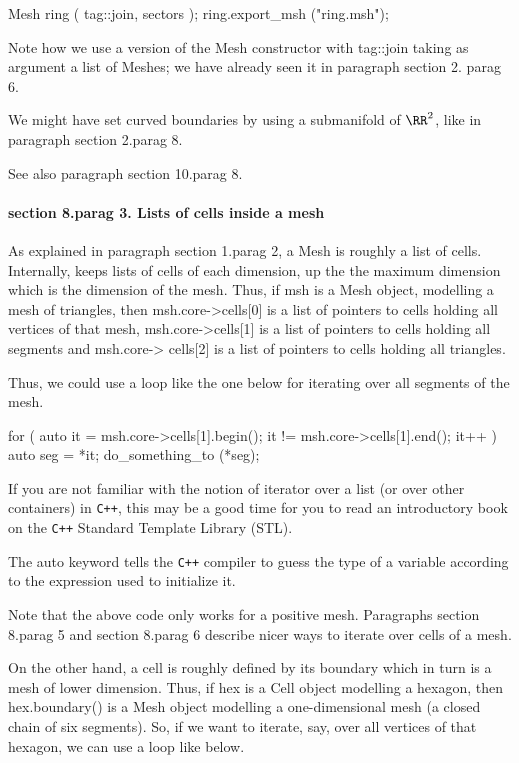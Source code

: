    Mesh ring ( tag::join, sectors );
   ring.export_msh ("ring.msh");
\endverbatim

Note how we use a version of the {\codett Mesh} constructor with {\codett tag::join} taking as
argument a list of {\codett Mesh}es; we have already seen it in paragraph \numb section 2.\numb
parag 6.

We might have set curved boundaries by using a submanifold of $ \RR^2 $, like in paragraph
\numb section 2.\numb parag 8.

See also paragraph \numb section 10.\numb parag 8.


\paragraph{\numb section 8.\numb parag 3. Lists of cells inside a mesh}

As explained in paragraph \numb section 1.\numb parag 2, a {\codett Mesh} is
roughly a list of cells.
Internally, {\maniFEM} keeps lists of cells of each dimension, up the the maximum
dimension which is the dimension of the mesh.
Thus, if {\codett msh} is a {\codett Mesh} object, modelling a
mesh of triangles, then {\codett msh.core->cells[0]} is a list of pointers to cells holding
all vertices of that mesh, {\codett msh.core->cells[1]} is a list of pointers to cells
holding all segments and {\codett msh.core-> cells[2]} is a list of pointers to cells
holding all triangles.

Thus, we could use a loop like the one below for iterating over all segments of the mesh.

\verbatim
   for ( auto it = msh.core->cells[1].begin();
              it != msh.core->cells[1].end();  it++ )
   { auto seg = *it;  do_something_to (*seg);  }
\endverbatim

If you are not familiar with the notion of iterator over a list (or over other containers)
in {\tt C++}, this may be a good time for you to read an introductory book on the
{\tt C++} Standard Template Library (STL).

The {\codett auto} keyword tells the {\tt C++} compiler to guess the type of a variable
according to the expression used to initialize it.

Note that the above code only works for a positive mesh.
Paragraphs \numb section 8.\numb parag 5 and \numb section 8.\numb parag 6 describe
nicer ways to iterate over cells of a mesh.

On the other hand, a cell is roughly defined by its boundary which in turn is a mesh of
lower dimension.
Thus, if {\codett hex} is a {\codett Cell} object modelling a hexagon,
then {\codett hex.boundary()} is a {\codett Mesh} object modelling a
one-dimensional mesh (a closed chain of six segments).
So, if we want to iterate, say, over all vertices of that hexagon, we can use a 
loop like below.

